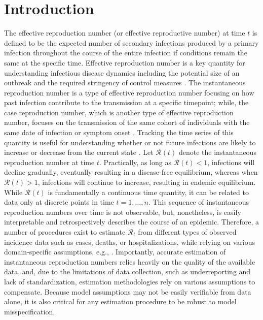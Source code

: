 \documentclass[10pt,letterpaper]{article}
\def\calR{\mathcal{R}}
\begin{document}
\linenumbers

\section{Introduction}
\label{sec:intro}

The effective reproduction number (or effective reproductive number) at time
$\textit{t}$ is defined to be the expected number of secondary infections
produced by a primary infection throughout the course of the entire infection if
conditions remain the same at the specific time. Effective reproduction number
is a key quantity for understanding infectious disease dynamics including the
potential size of an outbreak and the required stringency of control measures
\cite{nishiura2009effective,fraser2007estimating}. The instantaneous
reproduction number is a type of effective reproduction number focusing on how
past infection contribute to the transmission at a specific timepoint; while,
the case reproduction number, which is another type of effective reproduction
number, focuses on the transmission of the same cohort of individuals with the
same date of infection or symptom onset \cite{gostic2020practical}. Tracking the
time series of this quantity is useful for understanding whether or not future
infections are likely to increase or decrease from the current state
\cite{anderson1991infectious}. Let $\calR(t)$ denote the instantaneous
reproduction number at time $t$. Practically, as long as $\calR(t) < 1$,
infections will decline gradually, eventually resulting in a disease-free
equilibrium, whereas when $\calR(t) > 1$, infections will continue to increase,
resulting in endemic equilibrium. While $\calR(t)$ is fundamentally a continuous
time quantity, it can be related to data only at discrete points in time $t =
1,\ldots,n$. This sequence of instantaneous reproduction numbers over time is
not observable, but, nonetheless, is easily interpretable and retrospectively
describes the course of an epidemic. Therefore, a number of procedures exist to
estimate $\calR_t$ from different types of observed incidence data such as
cases, deaths, or hospitalizations, while relying on various domain-specific
assumptions, e.g.,
\cite{wallinga2004different,hao2020reconstruction,goldstein2023semiparametric,goldstein2024incorporating}.
Importantly, accurate estimation of instantaneous reproduction numbers relies
heavily on the quality of the available data, and, due to the limitations of
data collection, such as underreporting and lack of standardization, estimation
methodologies rely on various assumptions to compensate. Because model
assumptions may not be easily verifiable from data alone, it is also critical
for any estimation procedure to be robust to model misspecification. 
\end{document}
